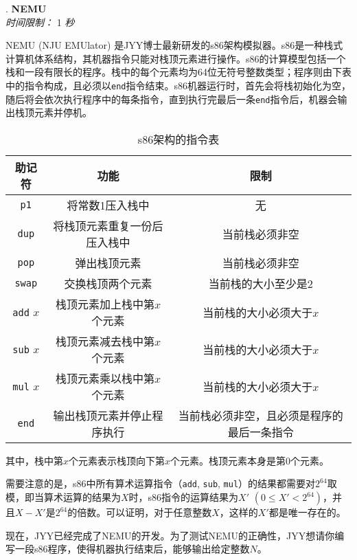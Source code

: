 \addtocounter{ProblemNo}{1}
\renewcommand{\ProblemName}{NEMU}
\begin{center}
\huge{. \textbf{\ProblemName}} \\ [0.8cm]
\large{\textit{时间限制：} 1 \textit{秒}} \\ [1cm]
\end{center}

NEMU (NJU EMUlator) 是JYY博士最新研发的s86架构模拟器。s86是一种栈式计算机体系结构，其机器指令只能对栈顶元素进行操作。s86的计算模型包括一个栈和一段有限长的程序。栈中的每个元素均为64位无符号整数类型；程序则由下表中的指令构成，且必须以\texttt{end}指令结束。s86机器运行时，首先会将栈初始化为空，随后将会依次执行程序中的每条指令，直到执行完最后一条\texttt{end}指令后，机器会输出栈顶元素并停机。

\begin{table}[htbp]
\centering
\begin{tabular}{ccc}
\hline
助记符 & 功能 & 限制  \\ \hline
\texttt{p1} & 将常数1压入栈中 & 无 \\ 
\texttt{dup} & 将栈顶元素重复一份后压入栈中 & 当前栈必须非空 \\
\texttt{pop} & 弹出栈顶元素 & 当前栈必须非空 \\
\texttt{swap} & 交换栈顶两个元素 & 当前栈的大小至少是2 \\ 
\texttt{add} $x$ & 栈顶元素加上栈中第$x$个元素 & 当前栈的大小必须大于$x$ \\ 
\texttt{sub} $x$ & 栈顶元素减去栈中第$x$个元素 & 当前栈的大小必须大于$x$ \\
\texttt{mul} $x$ & 栈顶元素乘以栈中第$x$个元素 & 当前栈的大小必须大于$x$ \\
\texttt{end} & 输出栈顶元素并停止程序执行 & 当前栈必须非空，且必须是程序的最后一条指令 \\ \hline
\end{tabular}
\caption{s86架构的指令表}
\end{table}

其中，栈中第$x$个元素表示栈顶向下第$x$个元素。栈顶元素本身是第0个元素。

需要注意的是，s86中所有算术运算指令（\texttt{add}, \texttt{sub}, \texttt{mul}）的结果都需要对$2^{64}$取模，即当算术运算的结果为$X$时，s86指令的运算结果为$X'$ $(0 \leq X' < 2^{64})$，并且$X - X'$是$2^{64}$的倍数。可以证明，对于任意整数$X$，这样的$X'$都是唯一存在的。

现在，JYY已经完成了NEMU的开发。为了测试NEMU的正确性，JYY想请你编写一段s86程序，使得机器执行结束后，能够输出给定整数$N$。

